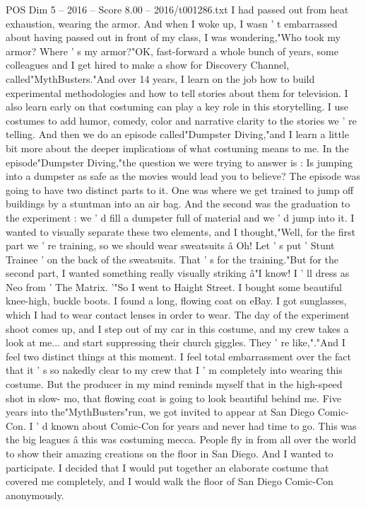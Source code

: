 \begin{textsample}{POS Dim 5 – 2016 – Score 8.00 – 2016/t001286.txt}
I had passed out from heat exhaustion, wearing the armor.
And when I woke up, I wasn ' t embarrassed about having passed out in front of my class, I was wondering,"Who took my armor?
Where ' s my armor?"OK, fast-forward a whole bunch of years, some colleagues and I get hired to make a show for Discovery Channel, called"MythBusters."And over 14 years, I learn on the job how to build experimental methodologies and how to tell stories about them for television.
I also learn early on that costuming can play a key role in this storytelling.
I use costumes to add humor, comedy, color and narrative clarity to the stories we ' re telling.
And then we do an episode called"Dumpster Diving,"and I learn a little bit more about the deeper implications of what costuming means to me.
In the episode"Dumpster Diving,"the question we were trying to answer is : Is jumping into a dumpster as safe as the movies would lead you to believe?
The episode was going to have two distinct parts to it.
One was where we get trained to jump off buildings by a stuntman into an air bag.
And the second was the graduation to the experiment : we ' d fill a dumpster full of material and we ' d jump into it.
I wanted to visually separate these two elements, and I thought,"Well, for the first part we ' re training, so we should wear sweatsuits â Oh!
Let ' s put ' Stunt Trainee ' on the back of the sweatsuits.
That ' s for the training."But for the second part, I wanted something really visually striking â"I know!
I ' ll dress as Neo from ' The Matrix. '"So I went to Haight Street.
I bought some beautiful knee-high, buckle boots.
I found a long, flowing coat on eBay.
I got sunglasses, which I had to wear contact lenses in order to wear.
The day of the experiment shoot comes up, and I step out of my car in this costume, and my crew takes a look at me... and start suppressing their church giggles.
They ' re like,"."And I feel two distinct things at this moment.
I feel total embarrassment over the fact that it ' s so nakedly clear to my crew that I ' m completely into wearing this costume.
But the producer in my mind reminds myself that in the high-speed shot in slow- mo, that flowing coat is going to look beautiful behind me.
Five years into the"MythBusters"run, we got invited to appear at San Diego Comic-Con.
I ' d known about Comic-Con for years and never had time to go.
This was the big leagues â this was costuming mecca.
People fly in from all over the world to show their amazing creations on the floor in San Diego.
And I wanted to participate.
I decided that I would put together an elaborate costume that covered me completely, and I would walk the floor of San Diego Comic-Con anonymously.

\end{textsample}
